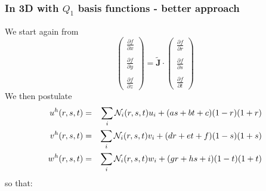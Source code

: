 \subsubsection{In 3D with $Q_1$ basis functions - better approach}

We start again from 
\[
\left(
\begin{array}{c}
\frac{\partial f}{\partial x} \\ \\
\frac{\partial f}{\partial y} \\ \\
\frac{\partial f}{\partial z} 
\end{array}
\right)
=
\tilde{\bm J} \cdot
\left(
\begin{array}{c}
\frac{\partial f}{\partial r} \\ \\
\frac{\partial f}{\partial s} \\ \\ 
\frac{\partial f}{\partial t} 
\end{array}
\right)
\]
We then postulate 
\begin{eqnarray}
u^h(r,s,t)&=&\sum_i {\mathcal{N}}_i(r,s,t) u_i + (a s + b t +c)(1-r)(1+r) \nonumber\\
v^h(r,s,t)&=&\sum_i {\mathcal{N}}_i(r,s,t) v_i + (d r + e t +f)(1-s)(1+s) \nonumber\\
w^h(r,s,t)&=&\sum_i {\mathcal{N}}_i(r,s,t) w_i + (g r + h s +i)(1-t)(1+t) \nonumber
\end{eqnarray}
so that:
